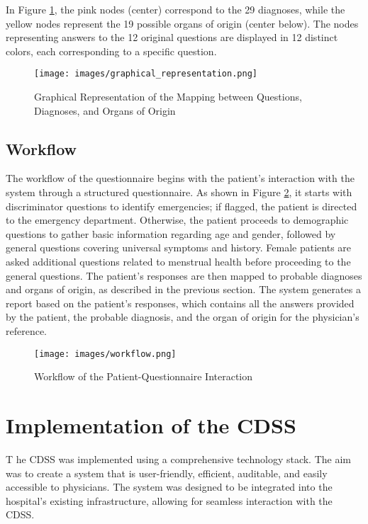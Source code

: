 \noindent In Figure \ref{fig:graphical_representation}, the pink nodes (center) correspond to the 29 diagnoses, while the yellow nodes represent the 19 possible organs of origin (center below). The nodes representing answers to the 12 original questions are displayed in 12 distinct colors, each corresponding to a specific question.

\begin{figure}[H]
    \centering
    \texttt{[image: images/graphical\_representation.png]}
    \caption{Graphical Representation of the Mapping between Questions, Diagnoses, and Organs of Origin}
    \label{fig:graphical_representation}
\end{figure}

\subsection{Workflow}
The workflow of the questionnaire begins with the patient's interaction with the system through a structured questionnaire. As shown in Figure \ref{fig:workflow}, it starts with discriminator questions to identify emergencies; if flagged, the patient is directed to the emergency department. Otherwise, the patient proceeds to demographic questions to gather basic information regarding age and gender, followed by general questions covering universal symptoms and history. Female patients are asked additional questions related to menstrual health before proceeding to the general questions. The patient's responses are then mapped to probable diagnoses and organs of origin, as described in the previous section. The system generates a report based on the patient's responses, which contains all the answers provided by the patient, the probable diagnosis, and the organ of origin for the physician's reference.
\begin{figure}[H]
    \centering
    \texttt{[image: images/workflow.png]}
    \caption{Workflow of the Patient-Questionnaire Interaction}
    \label{fig:workflow}
\end{figure}

\section{Implementation of the CDSS}
\lettrine{T}{ }he CDSS was implemented using a comprehensive technology stack. The aim was to create a system that is user-friendly, efficient, auditable, and easily accessible to physicians. The system was designed to be integrated into the hospital's existing infrastructure, allowing for seamless interaction with the CDSS.\\[\baselineskip]

